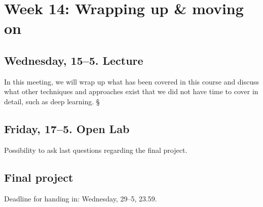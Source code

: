 \documentclass[a4paper,10pt]{report}
\begin{document}
\section*{Week 14: Wrapping up \& moving on}

\subsection*{Wednesday, 15--5. Lecture}
In this meeting, we will wrap up what has been covered in this course and discuss what other techniques and approaches exist that we did not have time to cover in detail, such as deep learning. §

\subsection*{Friday, 17--5. Open Lab}
Possibility to ask last questions regarding the final project.

\subsection*{Final project}
Deadline for handing in: Wednesday, 29--5, 23.59.




 
 
 
\end{document}
